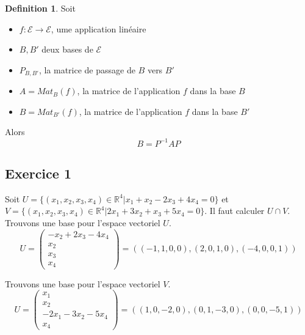 \documentclass[]{book}
\theoremstyle{definition}
\newtheorem{defn}{Definition}
\newcommand{\bb}[1]{\mathbb{#1}}
\newcommand{\R}{\bb{R}}
\newcommand{\E}{\mathscr{E}}
\begin{document}
\begin{defn}
Soit 
\begin{itemize}
\item $f: \E \to \E$, ume application lin\'eaire
\item $B,B'$ deux bases de $\E$
\item $P_{B,B'}$, la matrice de passage de $B$ vers $B'$
\item $A=Mat_{B}(f)$, la matrice de l'application $f$ dans la base $B$
\item $B=Mat_{B'}(f)$, la matrice de l'application $f$ dans la base $B'$
\end{itemize}
Alors $$B = P^{-1}AP$$
\end{defn}



\newpage
\subsection*{Exercice 1}

Soit $U=\{(x_1,x_2,x_3,x_4) \in \R^4 | x_1+x_2-2x_3+4x_4 = 0\}$ et $V=\{(x_1,x_2,x_3,x_4) \in \R^4 | 2x_1+3x_2+x_3+5x_4 = 0\}$. Il faut calculer $U \cap V$.\\
Trouvons une base pour l'espace vectoriel $U$. 
$$U=\begin{pmatrix} -x_2+2x_3-4x_4 \\ x_2 \\ x_3 \\ x_4 \end{pmatrix} = ((-1,1,0,0),(2,0,1,0),(-4,0,0,1))$$ 

Trouvons une base pour l'espace vectoriel $V$. 
$$U=\begin{pmatrix} x_1 \\ x_2 \\ -2x_1-3x_2-5x_4 \\ x_4 \end{pmatrix} = ((1,0,-2,0),(0,1,-3,0),(0,0,-5,1))$$ 
\end{document}
